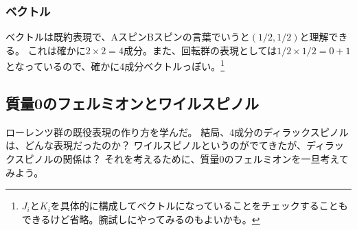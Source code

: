 \documentclass[10pt,a4paper]{jarticle}
\begin{document}
\subsubsection{ベクトル}
ベクトルは既約表現で、AスピンBスピンの言葉でいうと$(1/2,1/2)$と理解できる。
これは確かに$2\times 2 = 4$成分。また、回転群の表現としては$1/2 \times 1/2 = 0 +1$となっているので、確かに4成分ベクトルっぽい。\footnote{
$J_i$と$K_i$を具体的に構成してベクトルになっていることをチェックすることもできるけど省略。腕試しにやってみるのもよいかも。}

\subsection{質量0のフェルミオンとワイルスピノル}
ローレンツ群の既役表現の作り方を学んだ。
結局、4成分のディラックスピノルは、どんな表現だったのか？
ワイルスピノルというのがでてきたが、ディラックスピノルの関係は？
それを考えるために、質量0のフェルミオンを一旦考えてみよう。
\end{document}
